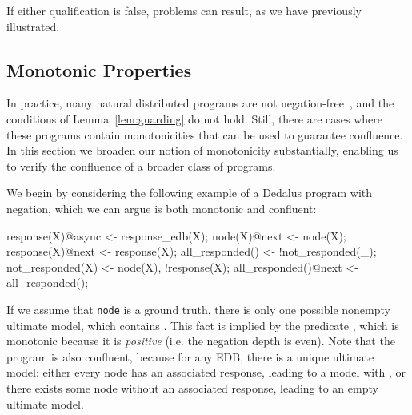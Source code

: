 If either qualification is false, problems can result, as we have previously illustrated.


\subsection{Monotonic Properties}

% 
In practice, many natural distributed programs are not negation-free~\cite{cidr11}, and the conditions of Lemma~\ref{lem:guarding} do not hold.  Still, there are cases where these programs contain monotonicities that can be used to guarantee confluence.  In this section we broaden our notion of monotonicity substantially, enabling us to verify the confluence of a broader class of programs.

We begin by considering the following example of a Dedalus program with negation, which we can argue is both monotonic and confluent:
\begin{example}
\begin{Dedalus}
response(X)@async <- response_edb(X);
node(X)@next <- node(X);
response(X)@next <- response(X);
all_responded() <- !not_responded(_);
not_responded(X) <- node(X), !response(X);
all_responded()@next <- all_responded();
\end{Dedalus}
\end{example}


If we assume that 
\texttt{node} is a ground truth,
there is only one possible nonempty ultimate model, which contains .
This fact is implied by the predicate , which 
is monotonic because it is {\em positive} (i.e. the negation depth is even). 
Note that the program is also confluent, because for any EDB, there is a unique ultimate model: either every node has an associated response, leading to a model with , or there exists some node without an associated response, leading to an empty ultimate model.

